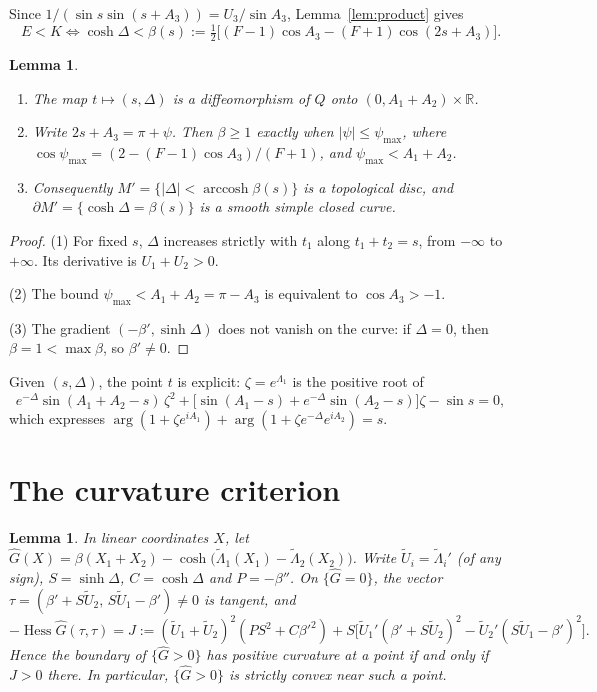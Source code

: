 \documentclass[11pt]{amsart}
\newtheorem{lemma}[theorem]{Lemma}
\theoremstyle{remark}
\newcommand{\R}{\mathbb{R}}
\DeclareMathOperator{\Hess}{Hess}
\DeclareMathOperator{\arccosh}{arccosh}
\begin{document}
Since $1/(\sin s\sin(s+A_3))=U_3/\sin A_3$, Lemma~\ref{lem:product} gives
\begin{equation}\label{eq:region}
  E<K\iff \cosh\Delta<\beta(s):=\tfrac12\bigl[(F-1)\cos A_3-(F+1)\cos(2s+A_3)\bigr].
\end{equation}

\begin{lemma}\label{lem:disc}
\begin{enumerate}
\item The map $t\mapsto(s,\Delta)$ is a diffeomorphism of $Q$ onto $(0,A_1+A_2)\times\R$.
\item Write $2s+A_3=\pi+\psi$. Then $\beta\ge1$ exactly when $|\psi|\le\psi_{\max}$, where
  $\cos\psi_{\max}=(2-(F-1)\cos A_3)/(F+1)$, and $\psi_{\max}<A_1+A_2$.
\item Consequently $M'=\{|\Delta|<\arccosh\beta(s)\}$ is a topological disc, and $\partial M'=\{\cosh\Delta=\beta(s)\}$
  is a smooth simple closed curve.
\end{enumerate}
\end{lemma}

\begin{proof}
(1) For fixed $s$, $\Delta$ increases strictly with $t_1$ along $t_1+t_2=s$, from $-\infty$ to $+\infty$. Its derivative
is $U_1+U_2>0$.

(2) The bound $\psi_{\max}<A_1+A_2=\pi-A_3$ is equivalent to $\cos A_3>-1$.

(3) The gradient $(-\beta',\sinh\Delta)$ does not vanish on the curve: if $\Delta=0$, then $\beta=1<\max\beta$, so
$\beta'\ne0$.
\end{proof}

Given $(s,\Delta)$, the point $t$ is explicit: $\zeta=e^{\Lambda_1}$ is the positive root of
\begin{equation}\label{eq:zeta}
  e^{-\Delta}\sin(A_1+A_2-s)\,\zeta^2+\bigl[\sin(A_1-s)+e^{-\Delta}\sin(A_2-s)\bigr]\zeta-\sin s=0 ,
\end{equation}
which expresses $\arg(1+\zeta e^{iA_1})+\arg(1+\zeta e^{-\Delta}e^{iA_2})=s$.

\section{The curvature criterion}

\begin{lemma}\label{lem:curv}
In linear coordinates $X$, let $\hat G(X)=\beta(X_1+X_2)-\cosh\bigl(\tilde\Lambda_1(X_1)-\tilde\Lambda_2(X_2)\bigr)$.
Write $\tilde U_i=\tilde\Lambda_i'$ (of any sign), $S=\sinh\Delta$, $C=\cosh\Delta$ and $P=-\beta''$. On $\{\hat G=0\}$,
the vector $\tau=(\beta'+S\tilde U_2,\,S\tilde U_1-\beta')\ne0$ is tangent, and
\[
  -\Hess\hat G(\tau,\tau)=J:=(\tilde U_1+\tilde U_2)^2(PS^2+C\beta'^2)
    +S\bigl[\tilde U_1'(\beta'+S\tilde U_2)^2-\tilde U_2'(S\tilde U_1-\beta')^2\bigr].
\]
Hence the boundary of $\{\hat G>0\}$ has positive curvature at a point if and only if $J>0$ there. In particular,
$\{\hat G>0\}$ is strictly convex near such a point.
\end{lemma}
\end{document}
